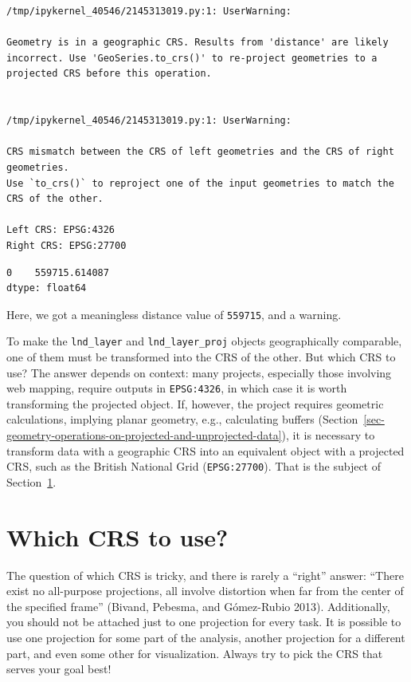 \documentclass[
  letterpaper,
]{krantz}
\begin{document}
\begin{verbatim}
/tmp/ipykernel_40546/2145313019.py:1: UserWarning:

Geometry is in a geographic CRS. Results from 'distance' are likely incorrect. Use 'GeoSeries.to_crs()' to re-project geometries to a projected CRS before this operation.


/tmp/ipykernel_40546/2145313019.py:1: UserWarning:

CRS mismatch between the CRS of left geometries and the CRS of right geometries.
Use `to_crs()` to reproject one of the input geometries to match the CRS of the other.

Left CRS: EPSG:4326
Right CRS: EPSG:27700

\end{verbatim}

\begin{verbatim}
0    559715.614087
dtype: float64
\end{verbatim}

Here, we got a meaningless distance value of \texttt{559715}, and a
warning.

To make the \texttt{lnd\_layer} and \texttt{lnd\_layer\_proj} objects
geographically comparable, one of them must be transformed into the CRS
of the other. But which CRS to use? The answer depends on context: many
projects, especially those involving web mapping, require outputs in
\texttt{EPSG:4326}, in which case it is worth transforming the projected
object. If, however, the project requires geometric calculations,
implying planar geometry, e.g., calculating buffers
(Section~\ref{sec-geometry-operations-on-projected-and-unprojected-data}),
it is necessary to transform data with a geographic CRS into an
equivalent object with a projected CRS, such as the British National
Grid (\texttt{EPSG:27700}). That is the subject of
Section~\ref{sec-which-crs-to-use}.

\section{Which CRS to use?}\label{sec-which-crs-to-use}

The question of which CRS is tricky, and there is rarely a ``right''
answer: ``There exist no all-purpose projections, all involve distortion
when far from the center of the specified frame'' (Bivand, Pebesma, and
Gómez-Rubio 2013). Additionally, you should not be attached just to one
projection for every task. It is possible to use one projection for some
part of the analysis, another projection for a different part, and even
some other for visualization. Always try to pick the CRS that serves
your goal best!
\end{document}
